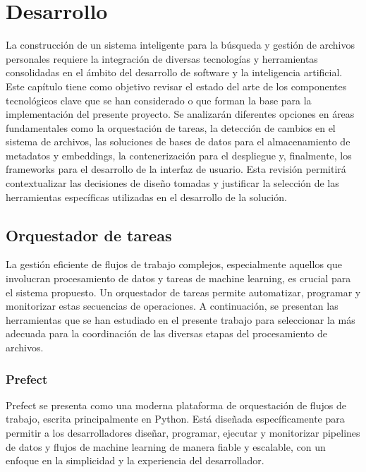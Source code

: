 
\chapter{Desarrollo}
\label{desarrollo}

La construcción de un sistema inteligente para la búsqueda y gestión de archivos personales requiere la integración de diversas tecnologías y herramientas consolidadas en el ámbito del desarrollo de software y la inteligencia artificial. Este capítulo tiene como objetivo revisar el estado del arte de los componentes tecnológicos clave que se han considerado o que forman la base para la implementación del presente proyecto. Se analizarán diferentes opciones en áreas fundamentales como la orquestación de tareas, la detección de cambios en el sistema de archivos, las soluciones de bases de datos para el almacenamiento de metadatos y embeddings, la contenerización para el despliegue y, finalmente, los frameworks para el desarrollo de la interfaz de usuario. Esta revisión permitirá contextualizar las decisiones de diseño tomadas y justificar la selección de las herramientas específicas utilizadas en el desarrollo de la solución.

\section{Orquestador de tareas}
La gestión eficiente de flujos de trabajo complejos, especialmente aquellos que involucran procesamiento de datos y tareas de machine learning, es crucial para el sistema propuesto. Un orquestador de tareas permite automatizar, programar y monitorizar estas secuencias de operaciones. A continuación, se presentan las herramientas que se han estudiado en el presente trabajo para seleccionar la más adecuada para la coordinación de las diversas etapas del procesamiento de archivos.

\subsection{Prefect}
Prefect se presenta como una moderna plataforma de orquestación de flujos de trabajo, escrita principalmente en Python. Está diseñada específicamente para permitir a los desarrolladores diseñar, programar, ejecutar y monitorizar pipelines de datos y flujos de machine learning de manera fiable y escalable, con un enfoque en la simplicidad y la experiencia del desarrollador.

